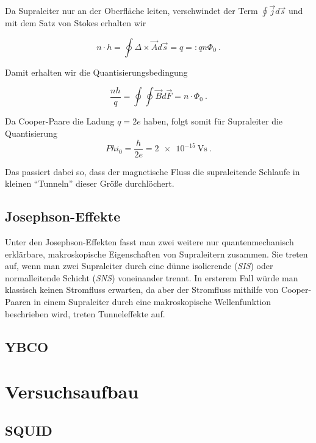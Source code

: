 \documentclass[a4paper,ngerman]{scrartcl}
\begin{document}
Da Supraleiter nur an der Oberfläche leiten, verschwindet der Term 
$\oint \vec{j}d\vec{s}$ und mit dem Satz von Stokes erhalten wir

\begin{equation}
  n \cdot h = \oint \Delta \times \vec{A} d\vec{s} =
  q =: q n \Phi_0 ~.
\end{equation}

Damit erhalten wir die Quantisierungsbedingung

\begin{equation}
  \frac{n h}{q} = \oint\oint\vec{B}d\vec{F} = n \cdot \Phi_0~.
\end{equation}

Da Cooper-Paare die Ladung $q = 2e$ haben, folgt somit für Supraleiter
die Quantisierung 
\begin{equation}
  \label{eq:phi0}
  Phi_0 = \frac{h}{2 e} = \SI{2e-15}{\volt\second}~.
\end{equation}

Das passiert dabei so, dass der magnetische Fluss die supraleitende
Schlaufe in kleinen "`Tunneln"' dieser Größe durchlöchert.

\subsection{Josephson-Effekte}
\label{ssec:josephson}
Unter den Josephson-Effekten fasst man zwei weitere nur
quantenmechanisch erklärbare, makroskopische Eigenschaften von
Supraleitern zusammen. 
Sie treten auf, wenn man zwei Supraleiter durch eine dünne
isolierende (\emph{SIS}) oder normalleitende
Schicht (\emph{SNS}) voneinander trennt. 
In ersterem Fall würde man klassisch keinen Stromfluss erwarten,
da aber der Stromfluss mithilfe von Cooper-Paaren in einem Supraleiter
durch eine makroskopische Wellenfunktion beschrieben wird, treten
Tunneleffekte auf.


\subsection{YBCO}

 


\section{Versuchsaufbau}

\subsection{SQUID}
\end{document}
